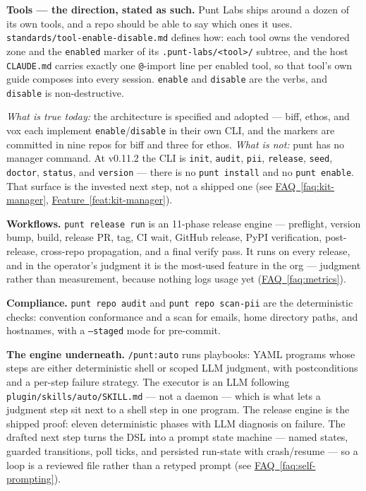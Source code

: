\documentclass[11pt,letterpaper]{article}
\newcommand{\faqref}[1]{\hyperref[#1]{FAQ~\ref*{#1}}}
\newcommand{\featureref}[1]{\hyperref[#1]{Feature~\ref*{#1}}}
\begin{document}
\textbf{Tools --- the direction, stated as such.} Punt Labs ships around a
dozen of its own tools, and a repo should be able to say which ones it uses.
\texttt{standards/tool-enable-disable.md} defines how: each tool owns the
vendored zone and the \texttt{enabled} marker of its
\texttt{.punt-labs/<tool>/} subtree, and the host \texttt{CLAUDE.md} carries
exactly one \texttt{@}-import line per enabled tool, so that tool's own guide
composes into every session. \texttt{enable} and \texttt{disable} are the
verbs, and \texttt{disable} is non-destructive.

\emph{What is true today:} the architecture is specified and adopted --- biff,
ethos, and vox each implement \texttt{enable}/\texttt{disable} in their own
CLI, and the markers are committed in nine repos for biff and three for ethos.
\emph{What is not:} punt has no manager command. At v0.11.2 the CLI is
\texttt{init}, \texttt{audit}, \texttt{pii}, \texttt{release}, \texttt{seed},
\texttt{doctor}, \texttt{status}, and \texttt{version} --- there is no
\texttt{punt install} and no \texttt{punt enable}. That surface is the
invested next step, not a shipped one
(see \faqref{faq:kit-manager}, \featureref{feat:kit-manager}).

\textbf{Workflows.} \texttt{punt release run} is an 11-phase release engine ---
preflight, version bump, build, release PR, tag, CI wait, GitHub release, PyPI
verification, post-release, cross-repo propagation, and a final verify pass.
It runs on every release, and in the operator's judgment it is the most-used
feature in the org --- judgment rather than measurement, because nothing logs
usage yet (\faqref{faq:metrics}).

\textbf{Compliance.} \texttt{punt repo audit} and \texttt{punt repo scan-pii} are the
deterministic checks: convention conformance and a scan for emails, home
directory paths, and hostnames, with a \texttt{--staged} mode for pre-commit.

\textbf{The engine underneath.} \texttt{/punt:auto} runs playbooks: YAML
programs whose steps are either deterministic shell or scoped LLM judgment,
with postconditions and a per-step failure strategy. The executor is an LLM
following \texttt{plugin/skills/auto/SKILL.md} --- not a daemon --- which is what lets
a judgment step sit next to a shell step in one program. The release engine is
the shipped proof: eleven deterministic phases with LLM diagnosis on failure.
The drafted next step turns the DSL into a prompt state machine --- named
states, guarded transitions, poll ticks, and persisted run-state with
crash/resume --- so a loop is a reviewed file rather than a retyped prompt
(see \faqref{faq:self-prompting}).
\end{document}
